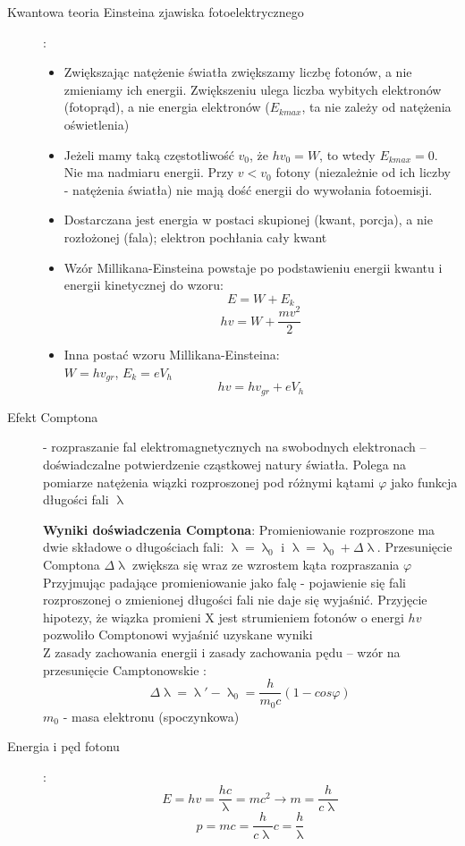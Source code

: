 \documentclass[a4paper,11pt]{article}
\begin{document}
\begin{description}
\begin{itemize}
  \end{itemize}
\item[Kwantowa teoria Einsteina zjawiska fotoelektrycznego]:\\
  \begin{itemize}
  \item Zwiększając natężenie światła zwiększamy liczbę fotonów, a nie zmieniamy ich energii. Zwiększeniu ulega liczba wybitych elektronów (fotoprąd), a nie energia elektronów ($E_{kmax}$, ta nie zależy od natężenia oświetlenia)
  \item Jeżeli mamy taką częstotliwość $v_0$, że $hv_0=W$, to wtedy $E_{kmax}=0$. Nie ma nadmiaru energii. Przy $v<v_0$ fotony (niezależnie od ich liczby - natężenia światła) nie mają dość energii do wywołania fotoemisji.
  \item Dostarczana jest energia w postaci skupionej (kwant, porcja), a nie rozłożonej (fala); elektron pochłania cały kwant
  \item Wzór Millikana-Einsteina powstaje po podstawieniu energii kwantu i energii kinetycznej do wzoru:
    $$E = W + E_k$$
    $$hv=W+\frac{mv^2}{2}$$
  \item Inna postać wzoru Millikana-Einsteina:\\
    $W=hv_{gr}$, $E_k=eV_h$
    $$hv=hv_{gr} + eV_h$$ 
  \end{itemize}
\item[Efekt Comptona] - rozpraszanie fal elektromagnetycznych na swobodnych elektronach -- doświadczalne potwierdzenie cząstkowej natury światła. Polega na pomiarze natężenia wiązki rozproszonej pod różnymi kątami $\varphi$ jako funkcja długości fali $\uplambda$

  \textbf{Wyniki doświadczenia Comptona}: Promieniowanie rozproszone ma dwie składowe o długościach fali: $\uplambda = \uplambda_0$ i $\uplambda = \uplambda_0 +\Delta\uplambda$. Przesunięcie Comptona $\Delta\uplambda$ zwiększa się wraz ze wzrostem kąta rozpraszania $\varphi$\\
  Przyjmując padające promieniowanie jako falę - pojawienie się fali rozproszonej o zmienionej długości fali nie daje się wyjaśnić. Przyjęcie hipotezy, że wiązka promieni X jest strumieniem fotonów o energi $hv$ pozwoliło Comptonowi wyjaśnić uzyskane wyniki\\
  Z zasady zachowania energii i zasady zachowania pędu -- wzór na przesunięcie Camptonowskie :
  $$\Delta\uplambda = \uplambda' -\uplambda_0 = \frac{h}{m_0c}\left(1-cos\varphi\right)$$
  $m_0$ - masa elektronu (spoczynkowa)
\item[Energia i pęd fotonu]:
  $$E=hv=\frac{hc}{\uplambda}=mc^2\longrightarrow m=\frac{h}{c\uplambda}$$
  $$p=mc=\frac{h}{c\uplambda}c = \frac{h}{\uplambda}$$
\end{description}
\end{document}
